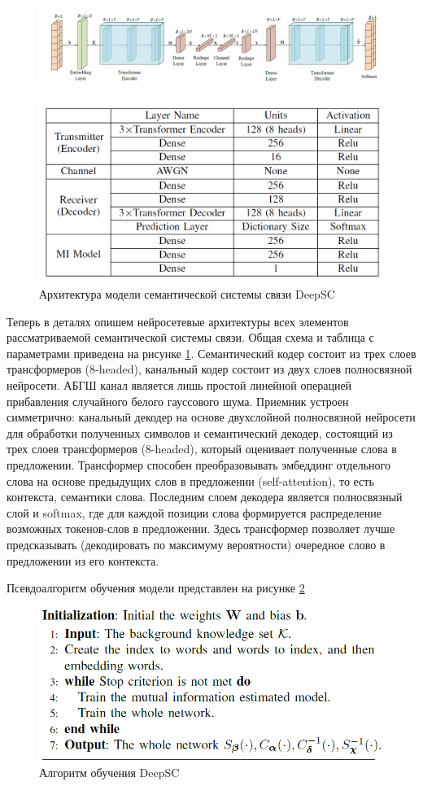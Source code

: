 \documentclass[a4paper,12pt]{article}
\begin{document}
	\begin{figure}[h!]
		\centering
		\includegraphics[width=0.8\linewidth]{figures/nn}
	\end{figure}
	\begin{figure}[h!]
		\centering
		\includegraphics[width=0.4\linewidth]{figures/table}
		\caption{Архитектура модели семантической системы связи DeepSC}
		\label{fig:nn}
	\end{figure}
	
		
	Теперь в деталях опишем нейросетевые архитектуры всех элементов рассматриваемой семантической системы связи. Общая схема и таблица с параметрами приведена на рисунке \ref{fig:nn}. Семантический кодер состоит из трех слоев трансформеров (8-headed), канальный кодер состоит из двух слоев полносвязной нейросети. АБГШ канал является лишь простой линейной операцией прибавления случайного белого гауссового шума. Приемник устроен симметрично: канальный декодер на основе двухслойной полносвязной нейросети для обработки полученных символов и семантический декодер, состоящий из трех слоев трансформеров (8-headed), который оценивает полученные слова в предложении. Трансформер способен преобразовывать эмбеддинг отдельного слова на основе предыдущих слов в предложении (self-attention), то есть контекста, семантики слова. Последним слоем декодера является полносвязный слой и softmax, где для каждой позиции слова формируется распределение возможных токенов-слов в предложении. Здесь трансформер позволяет лучше предсказывать (декодировать по максимуму вероятности) очередное слово в предложении из его контекста.
	
	Псевдоалгоритм обучения модели представлен на рисунке \ref{fig:alg}   
	
	\begin{figure}[h!]
		\centering
		\includegraphics[width=0.4\linewidth]{figures/alg}
		\caption{Алгоритм обучения DeepSC}
		\label{fig:alg}
	\end{figure}
	
\end{document}
